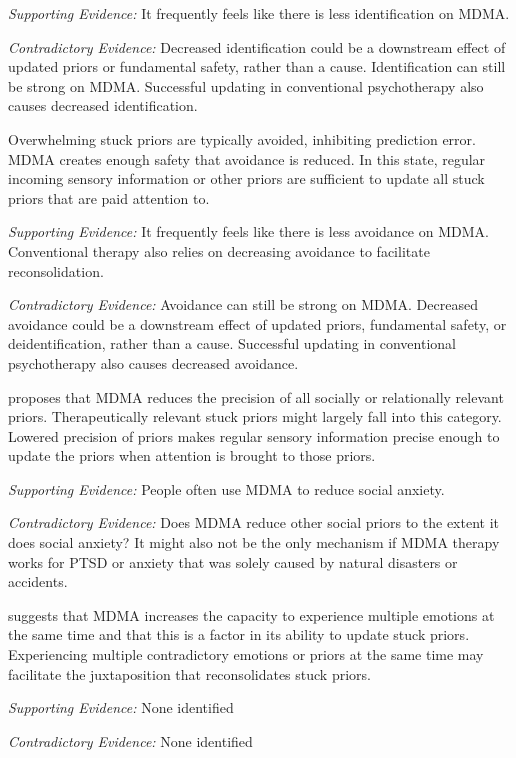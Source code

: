 \documentclass[11pt,oneside]{book}
\begin{document}
\begin{description}
    \textit{Supporting Evidence:} It frequently feels like there is less identification on MDMA.

    \textit{Contradictory Evidence:} Decreased identification could be a downstream effect of updated priors or fundamental safety, rather than a cause. Identification can still be strong on MDMA. Successful updating in conventional psychotherapy also causes decreased identification.

    \item[Decreased Avoidance of Stuck Priors] Overwhelming stuck priors are typically avoided, inhibiting prediction error. MDMA creates enough safety that avoidance is reduced. In this state, regular incoming sensory information or other priors are sufficient to update all stuck priors that are paid attention to.
    
    \textit{Supporting Evidence:} It frequently feels like there is less avoidance on MDMA. Conventional therapy also relies on decreasing avoidance to facilitate reconsolidation.

    \textit{Contradictory Evidence:} Avoidance can still be strong on MDMA. Decreased avoidance could be a downstream effect of updated priors, fundamental safety, or deidentification, rather than a cause. Successful updating in conventional psychotherapy also causes decreased avoidance.

    \item[Reduced Precision of Social/Relational Priors] \textcite{carhart2019rebus} proposes that MDMA reduces the precision of all socially or relationally relevant priors. Therapeutically relevant stuck priors might largely fall into this category. Lowered precision of priors makes regular sensory information precise enough to update the priors when attention is brought to those priors.
    
    \textit{Supporting Evidence:} People often use MDMA to reduce social anxiety.

    \textit{Contradictory Evidence:} Does MDMA reduce other social priors to the extent it does social anxiety? It might also not be the only mechanism if MDMA therapy works for PTSD or anxiety that was solely caused by natural disasters or accidents.
    
    \item[Increased Capacity to Experience Multiple Concurrent Emotions] \textcite{emilssonConcurrent} suggests that MDMA increases the capacity to experience multiple emotions at the same time and that this is a factor in its ability to update stuck priors. Experiencing multiple contradictory emotions or priors at the same time may facilitate the juxtaposition that reconsolidates stuck priors.

    \textit{Supporting Evidence:} None identified

    \textit{Contradictory Evidence:} None identified
\end{description}
\end{document}
